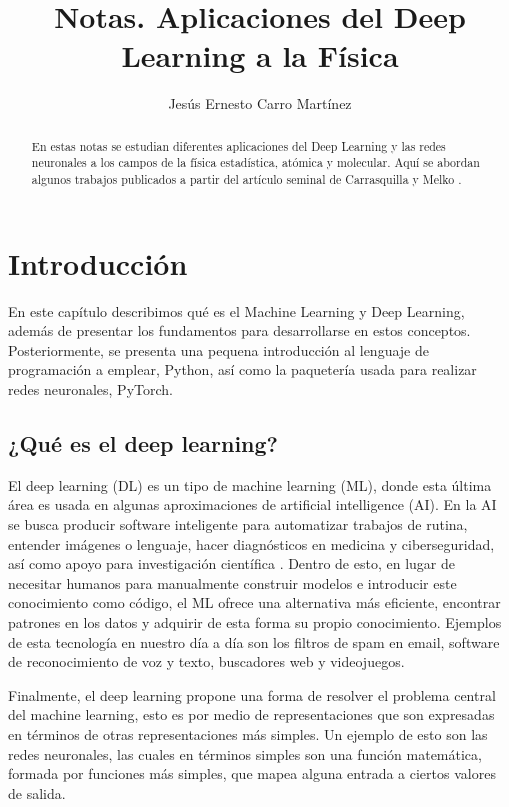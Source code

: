 \documentclass[12pt,oneside,openany]{memoir}
\title{Notas. Aplicaciones del Deep Learning a la Física}
\author{Jesús Ernesto Carro Martínez}
\begin{document}
\maketitle

\begin{abstract}
En estas notas se estudian diferentes aplicaciones del Deep Learning y las redes neuronales a los campos de la física estadística, atómica y molecular. Aquí se abordan algunos trabajos publicados a partir del artículo seminal de Carrasquilla y Melko \cite{Car17}.
\end{abstract}

\newpage

\chapter{Introducción}

En este capítulo describimos qué es el Machine Learning y Deep Learning, además de presentar los fundamentos para desarrollarse en estos conceptos. Posteriormente, se presenta una pequena introducción al lenguaje de programación a emplear, Python, así como la paquetería usada para realizar redes neuronales, PyTorch. 

\section{¿Qué es el deep learning?}

El deep learning (DL) es un tipo de machine learning (ML), donde esta última área es usada en algunas aproximaciones de artificial intelligence (AI). En la AI se busca producir software inteligente para automatizar trabajos de rutina, entender imágenes o lenguaje, hacer diagnósticos en medicina y ciberseguridad, así como apoyo para investigación científica \cite{Nil09}. Dentro de esto, en lugar de necesitar humanos para manualmente construir modelos e introducir este conocimiento como código, el ML ofrece una alternativa más eficiente, encontrar patrones en los datos y adquirir de esta forma su propio conocimiento. Ejemplos de esta tecnología en nuestro día a día son los filtros de spam en email, software de reconocimiento de voz y texto, buscadores web y videojuegos.

Finalmente, el deep learning propone una forma de resolver el problema central del machine learning, esto es por medio de representaciones que son expresadas en términos de otras representaciones más simples. Un ejemplo de esto son las redes neuronales, las cuales en términos simples son una función matemática, formada por funciones más simples, que mapea alguna entrada a ciertos valores de salida. 
\end{document}
